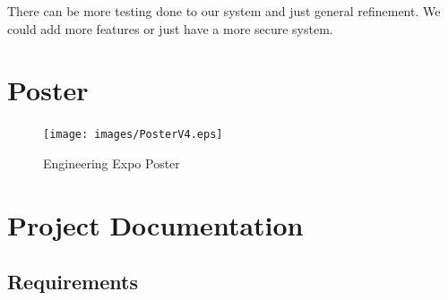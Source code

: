 \documentclass[10pt,letterpaper,onecolumn,draftclsnofoot]{IEEEtran}
\begin{document}
There can be more testing done to our system and just general refinement. We could add more features or just have a more secure system.\\
\clearpage
\section{Poster}
\begin{figure}[H]
  \texttt{[image: images/PosterV4.eps]}
  \caption{Engineering Expo Poster}
\end{figure}
\clearpage
\section{Project Documentation}
\subsection{Requirements}
\end{document}
